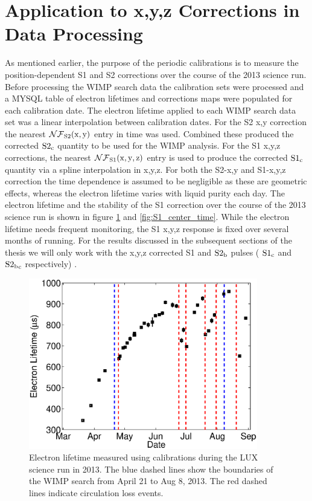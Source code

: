 \newpage

\section{Application to x,y,z Corrections in Data Processing}

As mentioned earlier, the purpose of the periodic \KrCal calibrations is to measure the position-dependent S1 and S2 corrections over the course of the 2013 science run. Before processing the WIMP search data the calibration sets were processed and a MYSQL table of electron lifetimes and corrections maps were populated for each calibration date. The electron lifetime applied to each WIMP search data set was a linear interpolation between calibration dates. For the S2 x,y correction the nearest $\rm \mathcal{NF}_{S2}(x,y)$ entry in time was used. Combined these produced the corrected $\rm S2_c$ quantity to be used for the WIMP analysis. For the S1 x,y,z corrections, the nearest $\rm \mathcal{NF}_{S1}(x,y,z)$ entry is used to produce the corrected $\rm S1_c$ quantity via a spline interpolation in x,y,z. For both the S2-x,y and S1-x,y,z correction the time dependence is assumed to be negligible as these are geometric effects, whereas the electron lifetime varies with liquid purity each day.
The electron lifetime and the stability of the S1 correction over the course of the 2013 science run is shown in figure \ref{fig:S2_EL_time} and \ref{fig:S1_center_time}. While the electron lifetime needs frequent monitoring, the S1 x,y,z response is fixed over several months of running.
For the results discussed in the subsequent sections of the thesis we will only work with the x,y,z corrected S1 and $\rm S2_b$ pulses ( $\rm S1_c$ and $\rm S2{_b}_c$ respectively) .

\begin{figure}[h!]\centering
\includegraphics[width=100mm]{Chapter_XYZ_Corr/Thesis_Corr_Plots/lifetime_fig_3.eps}
\caption{Electron lifetime measured using \KrCal calibrations during the LUX science run in 2013. The blue dashed lines show the boundaries of the WIMP search from April 21 to Aug 8, 2013. The red dashed lines indicate circulation loss events.}
\label{fig:S2_EL_time}
\end{figure}

